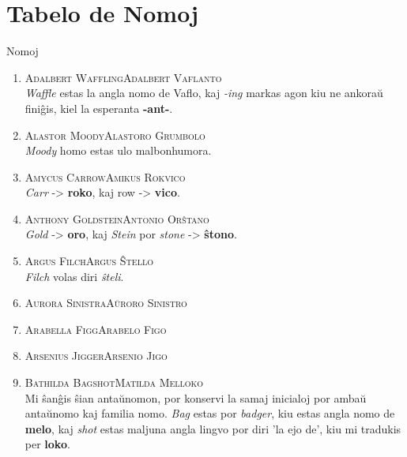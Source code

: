 \chapter*{Tabelo de Nomoj}

\begin{center}
  {\hpfont \large Nomoj}
\end{center}
\label{nomoj}

\begin{enumerate}
\item\label{nomoj:valfanto} \textsc{Adalbert Waffling}\dotfill \textsc{Adalbert Vaflanto} \\
{\footnotesize \indent \emph{Waffle} estas la angla nomo de Vaflo, kaj \emph{-ing}
markas agon kiu ne ankoraŭ finiĝis, kiel la esperanta \textbf{-ant-}.}
\smallskip

\item\label{nomoj:grumbolo} \textsc{Alastor Moody}\dotfill \textsc{Alastoro Grumbolo}\\
{\footnotesize \indent \emph{Moody} homo estas ulo malbonhumora.}
\smallskip

\item\label{nomoj:rokvico} \textsc{Amycus Carrow}\dotfill \textsc{Amikus Rokvico}\\
{\footnotesize \indent \emph{Carr} -> \textbf{roko}, kaj row -> \textbf{vico}.}
\smallskip

\item\label{nomoj:orŝtano} \textsc{Anthony Goldstein}\dotfill \textsc{Antonio Orŝtano}\\
{\footnotesize \emph{Gold} -> \textbf{oro}, kaj \emph{Stein} por \emph{stone} -> \textbf{ŝtono}.}
\smallskip

\item\label{nomoj:ŝtello} \textsc{Argus Filch}\dotfill \textsc{Argus Ŝtello}\\
{\footnotesize \indent \emph{Filch} volas diri \emph{ŝteli}.}
\smallskip

\item\label{nomoj:sinistro} \textsc{Aurora Sinistra}\dotfill \textsc{Aŭroro Sinistro}\\
\item\label{nomoj:figo} \textsc{Arabella Figg}\dotfill \textsc{Arabelo Figo}\\
\item\label{nomoj:jigo} \textsc{Arsenius Jigger}\dotfill \textsc{Arsenio Jigo}\\

\item\label{nomoj:melloko} \textsc{Bathilda Bagshot}\dotfill \textsc{Matilda Melloko}\\
{\footnotesize \indent Mi ŝanĝis ŝian antaŭnomon, por konservi la samaj inicialoj por ambaŭ antaŭnomo kaj familia nomo.
\emph{Bag} estas por \emph{badger}, kiu estas angla nomo de
\textbf{melo}, kaj \emph{shot} estas maljuna angla lingvo por diri 'la
ejo de', kiu mi tradukis per \textbf{loko}.}
\smallskip



\end{enumerate}
